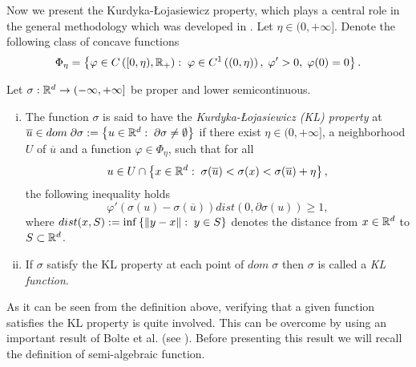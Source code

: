 Now we present the Kurdyka-{\L}ojasiewicz property, which plays a central role in the general methodology which was developed in \cite{BST2014}. Let $\eta \in (0,+\infty]$. Denote the following class of concave functions
\begin{equation*}
	\Phi_{\eta} = \left\lbrace \varphi \in C\left([0,\eta), \mathbb{R}_+ \right)  : \; \varphi \in C^1\left((0,\eta)\right), \; \varphi'>0, \; \varphi(0)=0 \right\rbrace .
\end{equation*}

\begin{definition}
	Let $\sigma: \mathbb{R}^d \rightarrow (-\infty,+\infty]$ be proper and lower semicontinuous.
	\begin{enumerate}[(i)]
		\item The function $\sigma$ is said to have the \textit{Kurdyka-{\L}ojasiewicz (KL) property} at $\overline{u} \in dom \; \partial\sigma :=  \left\lbrace u \in \mathbb{R}^d : \; \partial\sigma \neq \emptyset \right\rbrace$ if there exist $\eta \in (0,+\infty]$, a neighborhood $U$ of $\overline{u}$ and a function $\varphi \in \Phi_{\eta}$, such that for all
		\begin{equation*}
			u \in U \cap \left\lbrace x \in \mathbb{R}^d : \; \sigma(\overline{u}) < \sigma(x) < \sigma(\overline{u}) + \eta \right\rbrace,
		\end{equation*}
		the following inequality holds
		\begin{equation*}
			\varphi'(\sigma(u) - \sigma(\overline{u}))dist(0,\partial\sigma(u)) \geq 1,
		\end{equation*}
		where $dist(x,S) := \inf \left\lbrace \left\Vert {y-x} \right\Vert : \; y \in S\right\rbrace$ denotes the distance from $x \in \mathbb{R}^d$ to $S \subset \mathbb{R}^d$.
		\item If $\sigma$ satisfy the KL property at each point of $dom\;\sigma$ then $\sigma$ is called a \textit{KL function}.
	\end{enumerate}
\end{definition}

As it can be seen from the definition above, verifying that a given function satisfies the KL property is quite involved. This can be overcome by using an important result of Bolte et al. (see \cite{BDL2006}). Before presenting this result we will recall the definition of semi-algebraic function.


